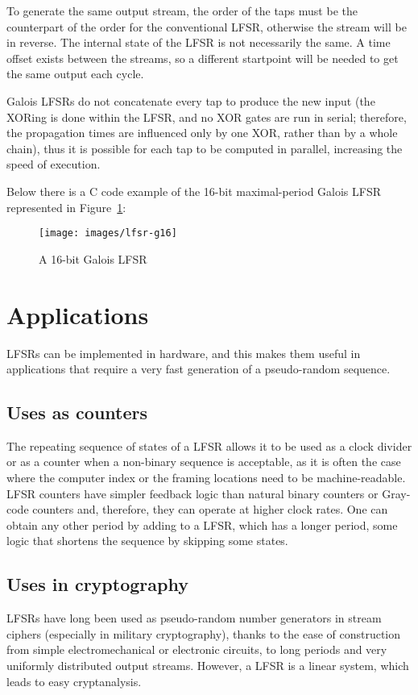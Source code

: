 \documentclass[11pt,a4paper,oneside, openright]{article}
\begin{document}
To generate the same output stream, the order of the taps must be the counterpart of the order for the conventional LFSR, otherwise the stream will be in reverse. The internal state of the LFSR is not necessarily the same. A time offset exists between the streams, so a different startpoint will be needed to get the same output each cycle.

Galois LFSRs do not concatenate every tap to produce the new input (the XORing is done within the LFSR, and no XOR gates are run in serial; therefore, the propagation times are influenced only by one XOR, rather than by a whole chain), thus it is possible for each tap to be computed in parallel, increasing the speed of execution.

Below there is a C code example of the 16-bit maximal-period Galois LFSR represented in Figure~\ref{fig:lfsr-g16}:



\begin{figure}
    \centering
    \texttt{[image: images/lfsr-g16]}
    \caption{A 16-bit Galois LFSR}
    \label{fig:lfsr-g16}
\end{figure}

\newpage

\section{Applications}
LFSRs can be implemented in hardware, and this makes them useful in applications \cite{lfsr} that require a very fast generation of a pseudo-random sequence.

\subsection{Uses as counters}
The repeating sequence of states of a LFSR allows it to be used as a clock divider or as a counter when a non-binary sequence is acceptable, as it is often the case where the computer index or the framing locations need to be machine-readable. LFSR counters have simpler feedback logic than natural binary counters or Gray-code counters and, therefore, they can operate at higher clock rates. One can obtain any other period by adding to a LFSR, which has a longer period, some logic that shortens the sequence by skipping some states.

\subsection{Uses in cryptography}
LFSRs have long been used as pseudo-random number generators in stream ciphers (especially in military cryptography), thanks to the ease of construction from simple electromechanical or electronic circuits, to long periods and very uniformly distributed output streams. However, a LFSR is a linear system, which leads to easy cryptanalysis.
\end{document}
